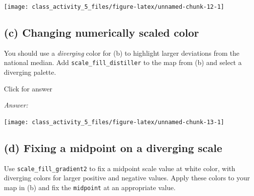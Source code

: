 \documentclass[
]{book}
\newenvironment{Shaded}{\begin{snugshade}}{\end{snugshade}}
\newcommand{\AttributeTok}[1]{\textcolor[rgb]{0.13,0.29,0.53}{#1}}
\newcommand{\CommentTok}[1]{\textcolor[rgb]{0.56,0.35,0.01}{\textit{#1}}}
\newcommand{\DecValTok}[1]{\textcolor[rgb]{0.00,0.00,0.81}{#1}}
\newcommand{\FunctionTok}[1]{\textcolor[rgb]{0.13,0.29,0.53}{\textbf{#1}}}
\newcommand{\NormalTok}[1]{#1}
\newcommand{\SpecialCharTok}[1]{\textcolor[rgb]{0.81,0.36,0.00}{\textbf{#1}}}
\newcommand{\StringTok}[1]{\textcolor[rgb]{0.31,0.60,0.02}{#1}}
\begin{document}
\texttt{[image: class\_activity\_5\_files/figure-latex/unnamed-chunk-12-1]}

\hypertarget{c-changing-numerically-scaled-color}{%
\subsection{(c) Changing numerically scaled color}\label{c-changing-numerically-scaled-color}}

You should use a \emph{diverging} color for (b) to highlight larger deviations from the national median. Add \texttt{scale\_fill\_distiller} to the map from (b) and select a diverging palette.

Click for answer

\emph{Answer:}

\begin{Shaded}
\end{Shaded}

\texttt{[image: class\_activity\_5\_files/figure-latex/unnamed-chunk-13-1]}

\hypertarget{d-fixing-a-midpoint-on-a-diverging-scale}{%
\subsection{(d) Fixing a midpoint on a diverging scale}\label{d-fixing-a-midpoint-on-a-diverging-scale}}

Use \texttt{scale\_fill\_gradient2} to fix a midpoint scale value at white color, with diverging colors for larger positive and negative values. Apply these colors to your map in (b) and fix the \texttt{midpoint} at an appropriate value.
\end{document}
